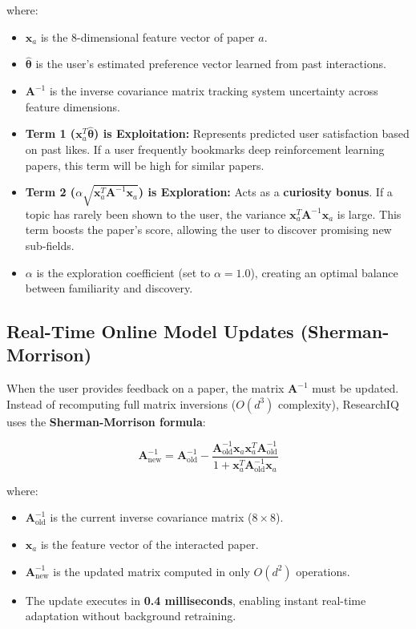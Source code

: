 \documentclass[11pt,a4paper]{article}
\begin{document}
\noindent where:
\begin{itemize}[leftmargin=1.5em]
    \item $\mathbf{x}_a$ is the 8-dimensional feature vector of paper $a$.
    \item $\hat{\boldsymbol{\theta}}$ is the user's estimated preference vector learned from past interactions.
    \item $\mathbf{A}^{-1}$ is the inverse covariance matrix tracking system uncertainty across feature dimensions.
    \item \textbf{Term 1 ($\mathbf{x}_a^T \hat{\boldsymbol{\theta}}$) is Exploitation:} Represents predicted user satisfaction based on past likes. If a user frequently bookmarks deep reinforcement learning papers, this term will be high for similar papers.
    \item \textbf{Term 2 ($\alpha \sqrt{\mathbf{x}_a^T \mathbf{A}^{-1} \mathbf{x}_a}$) is Exploration:} Acts as a \textbf{curiosity bonus}. If a topic has rarely been shown to the user, the variance $\mathbf{x}_a^T \mathbf{A}^{-1} \mathbf{x}_a$ is large. This term boosts the paper's score, allowing the user to discover promising new sub-fields.
    \item $\alpha$ is the exploration coefficient (set to $\alpha = 1.0$), creating an optimal balance between familiarity and discovery.
\end{itemize}

\subsection{Real-Time Online Model Updates (Sherman-Morrison)}
When the user provides feedback on a paper, the matrix $\mathbf{A}^{-1}$ must be updated. Instead of recomputing full matrix inversions ($O(d^3)$ complexity), ResearchIQ uses the \textbf{Sherman-Morrison formula}:

\begin{equation}
\mathbf{A}_{\text{new}}^{-1} = \mathbf{A}_{\text{old}}^{-1} - \frac{\mathbf{A}_{\text{old}}^{-1} \mathbf{x}_a \mathbf{x}_a^T \mathbf{A}_{\text{old}}^{-1}}{1 + \mathbf{x}_a^T \mathbf{A}_{\text{old}}^{-1} \mathbf{x}_a}
\end{equation}

\noindent where:
\begin{itemize}[leftmargin=1.5em]
    \item $\mathbf{A}_{\text{old}}^{-1}$ is the current inverse covariance matrix ($8 \times 8$).
    \item $\mathbf{x}_a$ is the feature vector of the interacted paper.
    \item $\mathbf{A}_{\text{new}}^{-1}$ is the updated matrix computed in only $O(d^2)$ operations.
    \item The update executes in \textbf{0.4 milliseconds}, enabling instant real-time adaptation without background retraining.
\end{itemize}
\end{document}
